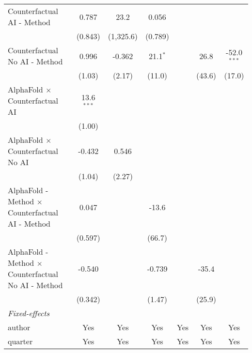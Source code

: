 \begin{tabular}{lcccccc}
   Counterfactual AI - Method                                 & 0.787        & 23.2      & 0.056        &               &              &   \\   
                                                              & (0.843)      & (1,325.6) & (0.789)      &               &              &   \\   
   Counterfactual No AI - Method                              & 0.996        & -0.362    & 21.1$^{*}$   &               & 26.8         & -52.0$^{***}$\\   
                                                              & (1.03)       & (2.17)    & (11.0)       &               & (43.6)       & (17.0)\\   
   AlphaFold $\times$ Counterfactual AI                       & 13.6$^{***}$ &           &              &               &              &   \\   
                                                              & (1.00)       &           &              &               &              &   \\   
   AlphaFold $\times$ Counterfactual No AI                    & -0.432       & 0.546     &              &               &              &   \\   
                                                              & (1.04)       & (2.27)    &              &               &              &   \\   
   AlphaFold - Method $\times$ Counterfactual AI - Method     & 0.047        &           & -13.6        &               &              &   \\   
                                                              & (0.597)      &           & (66.7)       &               &              &   \\   
   AlphaFold - Method $\times$ Counterfactual No AI - Method  & -0.540       &           & -0.739       &               & -35.4        &   \\   
                                                              & (0.342)      &           & (1.47)       &               & (25.9)       &   \\   
   \midrule
   \emph{Fixed-effects}\\
   author                                                     & Yes          & Yes       & Yes          & Yes           & Yes          & Yes\\  
   quarter                                                    & Yes          & Yes       & Yes          & Yes           & Yes          & Yes\\  

\end{tabular}
